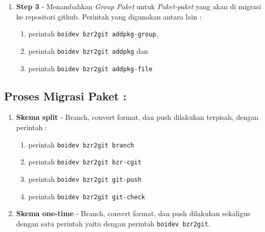 {\begin{enumerate}
\begin{itemize}
		\item Opsi Generate Key GnuPG.\\
		
		\item Memasukkan alamat bazaar repositori\\ (example: \textbf{http://dev.blankonlinux.or.id/browser/tambora})

		\item Memasukkan alamat github repositori\\ (example: \textbf{https://github.com/blankon-packages})	
	\end{itemize}
	
	\item \textbf{Step 3} -  Menambahkan \textit{Group Paket} untuk \textit{Paket-paket} yang akan di migrasi ke repositori github. Perintah yang digunakan antara lain :
	\label{itm:pre_step3}
	\begin{enumerate}
		\item perintah \texttt{boidev bzr2git addpkg-group},
		\item perintah \texttt{boidev bzr2git addpkg} dan
		\item perintah \texttt{boidev bzr2git addpkg-file}
	\end{enumerate}
\end{enumerate}

\subsection{Proses Migrasi Paket :}
\begin{enumerate}
	
	\item \textbf{Skema split} - Branch, convert format, dan push dilakukan terpisah, dengan perintah :
	\label{itm:metode_split}
	\begin{enumerate}
		\item perintah \texttt{boidev bzr2git branch}
		\item perintah \texttt{boidev bzr2git bzr-cgit}
		\item perintah \texttt{boidev bzr2git git-push}
		\item perintah \texttt{boidev bzr2git git-check}
	\end{enumerate}
	
	\item \textbf{Skema one-time} - Branch, convert format, dan push dilakukan sekaligus dengan satu perintah yaitu dengan perintah \texttt{boidev bzr2git}.
	\label{itm:metode_one-time}
\end{enumerate}

}
